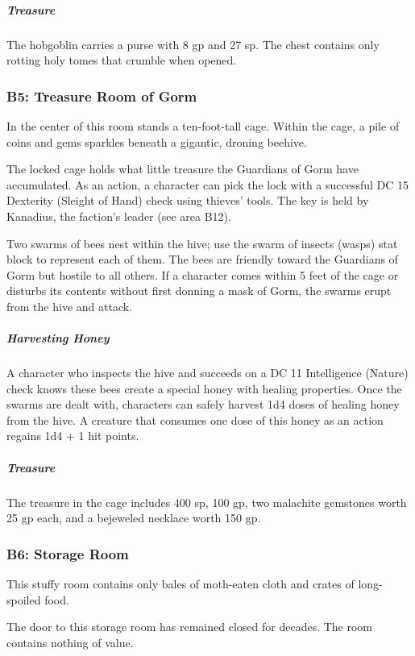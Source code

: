 \documentclass[10pt,a4paper,twoside,bg=print,twocolumn,openany,nodeprecatedcode]{dndbook}
\begin{document}
\subparagraph{Treasure}
The hobgoblin carries a purse with 8 gp and 27 sp. The chest contains only rotting holy tomes that crumble when opened.

\subsubsection{B5: Treasure Room of Gorm}
\begin{DndReadAloud}{}
In the center of this room stands a ten-foot-tall cage. Within the cage, a pile of coins and gems sparkles beneath a gigantic, droning beehive.

\end{DndReadAloud}

The locked cage holds what little treasure the Guardians of Gorm have accumulated. As an action, a character can pick the lock with a successful DC 15 Dexterity (Sleight of Hand) check using thieves' tools. The key is held by Kanadius, the faction's leader (see area B12).

Two swarms of bees nest within the hive; use the swarm of insects (wasps) stat block to represent each of them. The bees are friendly toward the Guardians of Gorm but hostile to all others. If a character comes within 5 feet of the cage or disturbs its contents without first donning a mask of Gorm, the swarms erupt from the hive and attack.

\subparagraph{Harvesting Honey}
A character who inspects the hive and succeeds on a DC 11 Intelligence (Nature) check knows these bees create a special honey with healing properties. Once the swarms are dealt with, characters can safely harvest 1d4 doses of healing honey from the hive. A creature that consumes one dose of this honey as an action regains 1d4 + 1 hit points.

\subparagraph{Treasure}
The treasure in the cage includes 400 sp, 100 gp, two malachite gemstones worth 25 gp each, and a bejeweled necklace worth 150 gp.

\subsubsection{B6: Storage Room}
\begin{DndReadAloud}{}
This stuffy room contains only bales of moth-eaten cloth and crates of long-spoiled food.

\end{DndReadAloud}

The door to this storage room has remained closed for decades. The room contains nothing of value.
\end{document}
